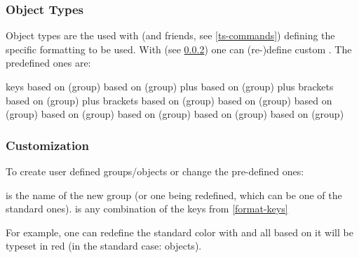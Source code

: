 \documentclass{article}
\begin{document}
\subsubsection{Object Types}\label{obj-types}
Object types are the  used with \tsobj{\tsobj} (and friends, see \ref{ts-commands}) defining the specific formatting to be used.
With  (see \ref{format-custom}) one can (re-)define custom . 
The predefined ones are:

\begin{describelist*}{keys}
   {based on (group) }
   {based on (group)  plus }
   {based on (group)  plus brackets}
   {based on (group)  plus brackets}
   {based on (group) }
   {based on (group) }
   {based on (group) }
   {based on (group) }
   {based on (group) }
    {based on (group) }
    {based on (group) }
\end{describelist*}

  

\subsubsection{Customization}\label{format-custom}

To create  user defined groups/objects or change the pre-defined ones:


\begin{codedescribe}[code,new=2023/05/16]{}
\begin{codesyntax} %
\end{codesyntax}
 is the name of the new group (or one being redefined, which can be one of the standard ones).  is any combination of the keys from \ref{format-keys}
\end{codedescribe}

For example, one can redefine the  standard color with  and all  based on it will be typeset in red (in the standard case:  objects).
\end{document}
